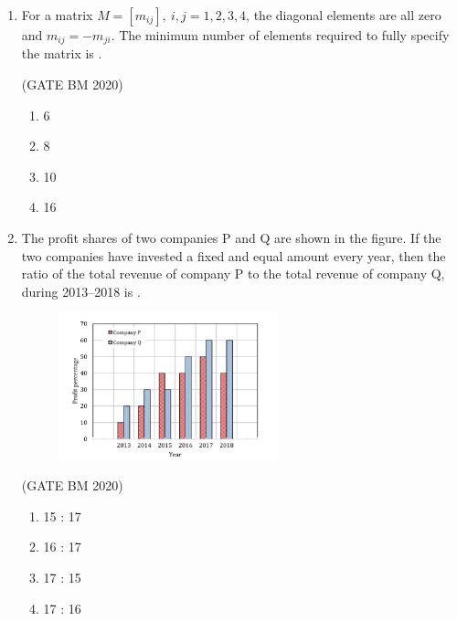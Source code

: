 \documentclass[journal]{IEEEtran}
\begin{document}
\begin{enumerate}
	\hfill(GATE BM 2020)
\begin{multicols}{4}
\begin{enumerate}
  \item 66.6
  \item 75.2
  \item 88.2
  \item 116.5
\end{enumerate}
\end{multicols}


\item For a matrix $M = [m_{ij}],\ i,j = 1,2,3,4$, the diagonal elements are all zero and $m_{ij} = -m_{ji}$.  
The minimum number of elements required to fully specify the matrix is \underline{\hspace{2cm}}.  

\hfill(GATE BM 2020)
\begin{multicols}{4}
\begin{enumerate}
  \item 6
  \item 8
  \item 10
  \item 16
\end{enumerate}
\end{multicols}


\item The profit shares of two companies P and Q are shown in the figure. If the two companies 
have invested a fixed and equal amount every year, then the ratio of the total revenue of 
company P to the total revenue of company Q, during 2013--2018 is \underline{\hspace{2cm}}.



    \begin{figure}[H]
    \centering
	    \includegraphics[width=0.6\textwidth]{Screenshot_2025_0822_151008.png}
\caption{}
    \label{fig:Q10}
\end{figure}

\hfill(GATE BM 2020)
\begin{multicols}{2}
\begin{enumerate}
\item 15 : 17
\item 16 : 17
\item 17 : 15
\item 17 : 16
\end{enumerate}
\end{multicols}



\end{enumerate}
\end{document}
